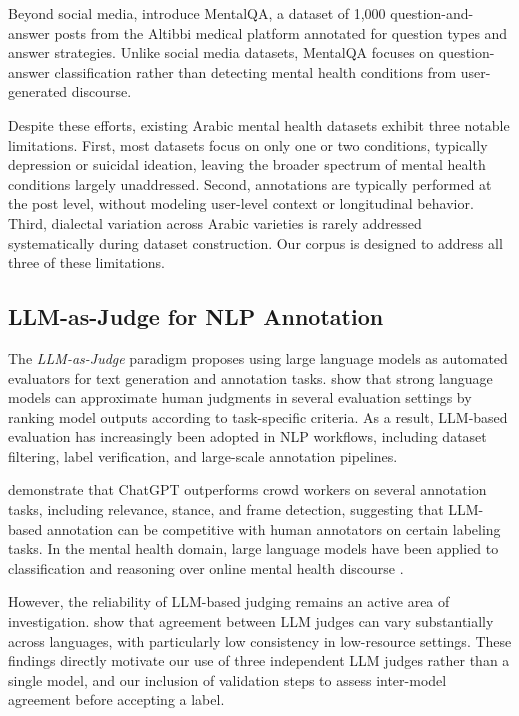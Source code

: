 \documentclass[11pt]{article}
\begin{document}
Beyond social media, \citet{alhuzali2024mentalqa} introduce MentalQA, a dataset
of 1,000 question-and-answer posts from the Altibbi medical platform annotated for
question types and answer strategies. Unlike social media datasets, MentalQA
focuses on question-answer classification rather than detecting mental health
conditions from user-generated discourse.

Despite these efforts, existing Arabic mental health datasets exhibit three
notable limitations. First, most datasets focus on only one or two conditions,
typically depression or suicidal ideation, leaving the broader spectrum of mental
health conditions largely unaddressed. Second, annotations are typically performed
at the post level, without modeling user-level context or longitudinal behavior.
Third, dialectal variation across Arabic varieties is rarely addressed
systematically during dataset construction. Our corpus is designed to address
all three of these limitations.

\subsection{LLM-as-Judge for NLP Annotation}
\label{subsec:related_llm_judge}

The \textit{LLM-as-Judge} paradigm proposes using large language models as
automated evaluators for text generation and annotation tasks.
\citet{zheng2023judging} show that strong language models can approximate human
judgments in several evaluation settings by ranking model outputs according to
task-specific criteria. As a result, LLM-based evaluation has increasingly been
adopted in NLP workflows, including dataset filtering, label verification, and
large-scale annotation pipelines.

\citet{gilardi2023chatgpt} demonstrate that ChatGPT outperforms crowd workers on
several annotation tasks, including relevance, stance, and frame detection,
suggesting that LLM-based annotation can be competitive with human annotators
on certain labeling tasks. In the mental health domain, large language models
have been applied to classification and reasoning over online mental health
discourse \cite{xu2024mental}.

However, the reliability of LLM-based judging remains an active area of
investigation. \citet{fu-liu-2025-reliable} show that agreement between LLM judges
can vary substantially across languages, with particularly low consistency in
low-resource settings. These findings directly motivate our use of three
independent LLM judges rather than a single model, and our inclusion of
validation steps to assess inter-model agreement before accepting a label.
\end{document}
